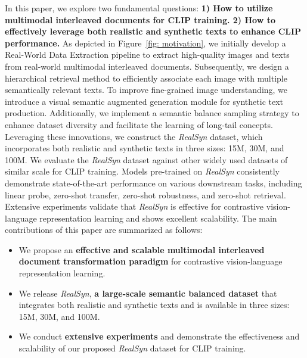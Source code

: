 In this paper, we explore two fundamental questions: \textbf{1) How to utilize multimodal interleaved documents for CLIP training. 2) How to effectively leverage both realistic and synthetic texts to enhance CLIP performance.} As depicted in Figure~\ref{fig: motivation}, we initially develop a Real-World Data Extraction pipeline to extract high-quality images and texts from real-world multimodal interleaved documents. Subsequently, we design a hierarchical retrieval method to efficiently associate each image with multiple semantically relevant texts. To improve fine-grained image understanding, we introduce a visual semantic augmented generation module for synthetic text production. Additionally, we implement a semantic balance sampling strategy to enhance dataset diversity and facilitate the learning of long-tail concepts. Leveraging these innovations, we construct the \textit{RealSyn} dataset, which incorporates both realistic and synthetic texts in three sizes: 15M, 30M, and 100M. We evaluate the \textit{RealSyn} dataset against other widely used datasets of similar scale for CLIP training. Models pre-trained on \textit{RealSyn} consistently demonstrate state-of-the-art performance on various downstream tasks, including linear probe, zero-shot transfer, zero-shot robustness, and zero-shot retrieval. Extensive experiments validate that \textit{RealSyn} is effective for contrastive vision-language representation learning and shows excellent scalability. The main contributions of this paper are summarized as follows:
\begin{itemize}[leftmargin=*]
\item We propose an \textbf{effective and scalable multimodal interleaved document transformation paradigm} for contrastive vision-language representation learning.
\item We release \textit{RealSyn}, \textbf{a large-scale semantic balanced dataset} that integrates both realistic and synthetic texts and is available in three sizes: 15M, 30M, and 100M.
\item We conduct \textbf{extensive experiments} and demonstrate the effectiveness and scalability of our proposed \textit{RealSyn} dataset for CLIP training.
\end{itemize}

